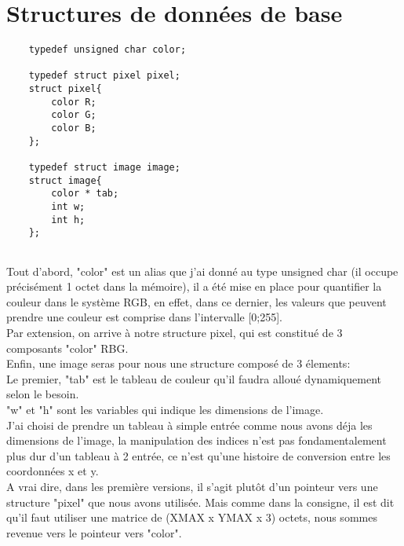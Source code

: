 \documentclass[12pt, letterpaper]{article}
\begin{document}
\section{Structures de données de base}
\begin{lstlisting}
    typedef unsigned char color;

    typedef struct pixel pixel;
    struct pixel{
        color R;
        color G;
        color B;
    };

    typedef struct image image;
    struct image{
        color * tab;
        int w;
        int h;
    };
        
\end{lstlisting}
Tout d'abord, "color" est un alias que j'ai donné au type unsigned char (il occupe précisément 1 octet dans la mémoire), il a été mise en place pour 
quantifier la couleur dans le système RGB, en effet, dans ce dernier, les valeurs que peuvent prendre
une couleur est comprise dans l'intervalle [0;255].\\
Par extension, on arrive à notre structure pixel, qui est constitué de 3 composants "color" RBG. \\
Enfin, une image seras pour nous une structure composé de 3 élements:\\
Le premier, "tab" est le tableau de couleur qu'il faudra alloué dynamiquement selon le besoin.\\
"w" et "h" sont les variables qui indique les dimensions de l'image.\\
J'ai choisi de prendre un tableau à simple entrée comme nous avons déja les dimensions de l'image, 
la manipulation des indices n'est pas fondamentalement plus dur d'un tableau à 2 entrée, ce n'est qu'une 
histoire de conversion entre les coordonnées x et y.\\
A vrai dire, dans les première versions, il s'agit plutôt d'un pointeur vers une structure "pixel" que nous avons utilisée.
Mais comme dans la consigne, il est dit qu'il faut utiliser une matrice de (XMAX x YMAX x 3) octets, nous sommes revenue vers le pointeur vers "color".
\end{document}
